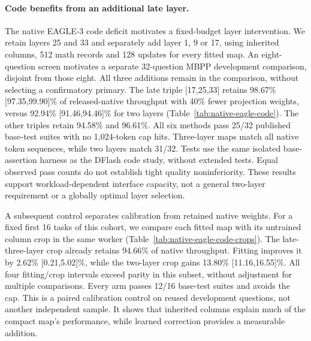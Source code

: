 \documentclass{article}
\begin{document}
\paragraph{Code benefits from an additional late layer.}
The native EAGLE-3 code deficit motivates a fixed-budget layer intervention.
We retain layers 25 and 33 and separately add layer 1, 9 or 17, using
inherited columns, 512 math records and 128 updates for every fitted map.
An eight-question screen motivates a separate 32-question MBPP development
comparison, disjoint from those eight. All three additions remain in the
comparison, without selecting a confirmatory primary. The late triple
[17,25,33] retains 98.67\% [97.35,99.90]\% of released-native throughput
with 40\% fewer projection weights, versus 92.94\% [91.46,94.46]\%
for two layers (Table~\ref{tab:native-eagle-code}). The other triples
retain 94.58\% and 96.61\%. All six methods pass 25/32 published base-test
suites with no 1,024-token cap hits. Three-layer maps match all native
token sequences, while two layers match 31/32. Tests use the same isolated
base-assertion harness as the DFlash code study, without extended tests.
Equal observed pass counts do not establish tight quality noninferiority.
These results support workload-dependent interface capacity, not a
general two-layer requirement or a globally optimal layer selection.

\begin{table}[H]
\centering\small

\caption{Native EAGLE-3 on 32 MBPP development tasks, all frozen layer
choices retained. Paired 95\% question-bootstrap intervals use 10,000
draws, seed 1729, without multiplicity adjustment. Fitted maps share
512 math records, 128 updates and inherited initialization.}
\label{tab:native-eagle-code}
\end{table}

A subsequent control separates calibration from retained native weights.
For a fixed first 16 tasks of this cohort, we compare each fitted map
with its untrained column crop in the same worker
(Table~\ref{tab:native-eagle-code-crops}). The late-three-layer crop
already retains 94.66\% of native throughput. Fitting improves it by
2.62\% [0.21,5.02]\%, while the two-layer crop gains 13.80\%
[11.16,16.55]\%. All four fitting/crop intervals exceed parity in this
subset, without adjustment for multiple comparisons. Every arm passes
12/16 base-test suites and avoids the cap. This is a paired calibration
control on reused development questions, not another independent sample.
It shows that inherited columns explain much of the compact map's
performance, while learned correction provides a measurable addition.
\end{document}
